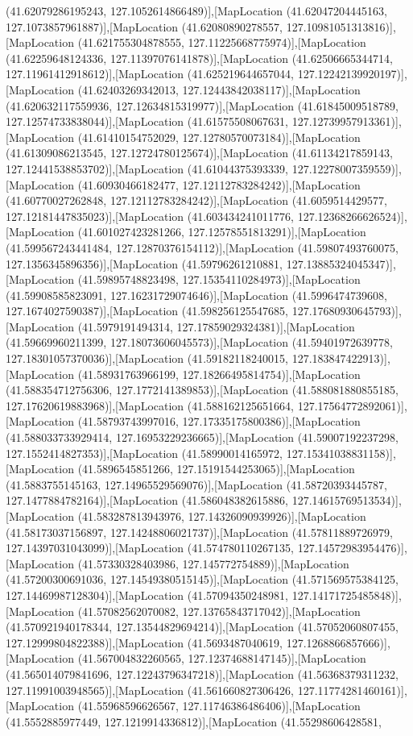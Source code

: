 (41.62079286195243, 127.1052614866489)],[MapLocation (41.62047204445163, 127.1073857961887)],[MapLocation (41.62080890278557, 127.10981051313816)],[MapLocation (41.621755304878555, 127.11225668775974)],[MapLocation (41.62259648124336, 127.11397076141878)],[MapLocation (41.62506665344714, 127.11961412918612)],[MapLocation (41.625219644657044, 127.12242139920197)],[MapLocation (41.62403269342013, 127.12443842038117)],[MapLocation (41.620632117559936, 127.12634815319977)],[MapLocation (41.61845009518789, 127.12574733838044)],[MapLocation (41.61575508067631, 127.12739957913361)],[MapLocation (41.61410154752029, 127.12780570073184)],[MapLocation (41.61309086213545, 127.12724780125674)],[MapLocation (41.61134217859143, 127.12441538853702)],[MapLocation (41.61044375393339, 127.12278007359559)],[MapLocation (41.60930466182477, 127.12112783284242)],[MapLocation (41.60770027262848, 127.12112783284242)],[MapLocation (41.6059514429577, 127.12181447835023)],[MapLocation (41.603434241011776, 127.12368266626524)],[MapLocation (41.601027423281266, 127.12578551813291)],[MapLocation (41.599567243441484, 127.12870376154112)],[MapLocation (41.59807493760075, 127.1356345896356)],[MapLocation (41.59796261210881, 127.13885324045347)],[MapLocation (41.59895748823498, 127.15354110284973)],[MapLocation (41.59908585823091, 127.16231729074646)],[MapLocation (41.5996474739608, 127.1674027590387)],[MapLocation (41.598256125547685, 127.17680930645793)],[MapLocation (41.5979191494314, 127.17859029324381)],[MapLocation (41.59669960211399, 127.18073606045573)],[MapLocation (41.59401972639778, 127.18301057370036)],[MapLocation (41.59182118240015, 127.183847422913)],[MapLocation (41.58931763966199, 127.18266495814754)],[MapLocation (41.588354712756306, 127.1772141389853)],[MapLocation (41.588081880855185, 127.17620619883968)],[MapLocation (41.588162125651664, 127.17564772892061)],[MapLocation (41.58793743997016, 127.17335175800386)],[MapLocation (41.588033733929414, 127.16953229236665)],[MapLocation (41.59007192237298, 127.1552414827353)],[MapLocation (41.58990014165972, 127.15341038831158)],[MapLocation (41.5896545851266, 127.15191544253065)],[MapLocation (41.5883755145163, 127.14965529569076)],[MapLocation (41.58720393445787, 127.1477884782164)],[MapLocation (41.586048382615886, 127.14615769513534)],[MapLocation (41.583287813943976, 127.14326090939926)],[MapLocation (41.58173037156897, 127.14248806021737)],[MapLocation (41.57811889726979, 127.14397031043099)],[MapLocation (41.574780110267135, 127.14572983954476)],[MapLocation (41.57330328403986, 127.145772754889)],[MapLocation (41.57200300691036, 127.14549380515145)],[MapLocation (41.571569575384125, 127.14469987128304)],[MapLocation (41.57094350248981, 127.14171725485848)],[MapLocation (41.57082562070082, 127.13765843717042)],[MapLocation (41.570921940178344, 127.13544829694214)],[MapLocation (41.57052060807455, 127.12999804822388)],[MapLocation (41.5693487040619, 127.1268866857666)],[MapLocation (41.567004832260565, 127.12374688147145)],[MapLocation (41.565014079841696, 127.12243796347218)],[MapLocation (41.56368379311232, 127.11991003948565)],[MapLocation (41.561660827306426, 127.11774281460161)],[MapLocation (41.55968596626567, 127.11746386486406)],[MapLocation (41.5552885977449, 127.1219914336812)],[MapLocation (41.55298606428581, 